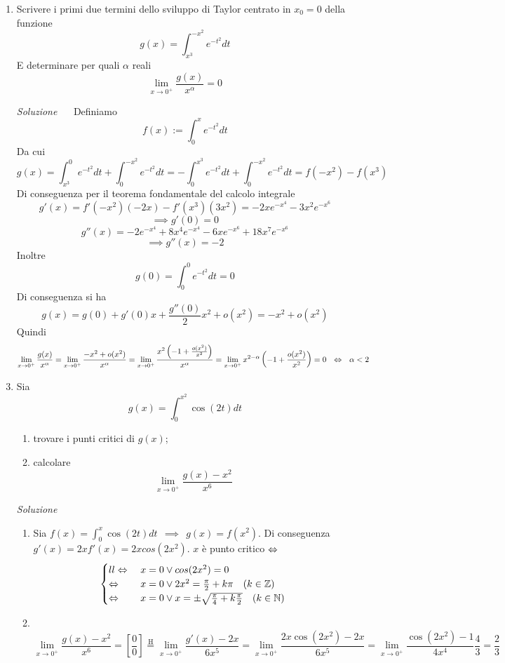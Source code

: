 \documentclass{article}
\begin{document}
\begin{enumerate}[label=\textbf{Esercizio 10.\arabic*.},itemindent=*]
\begin{proof}
    Perchè gli altri due integrali sono non negativi per ipotesi.
    \[\int_{x_0-\delta}^{x_0+\delta}f(x)dx=\sup s(\mathcal{D},f)\geq2\delta \inf_{[x_0-\delta, x_0+\delta]}f=2\delta \inf_{[x_0-\delta, x_0+\delta]}f>0\]
    Poiché $\inf_{[x_0-\delta, x_0+\delta]}f=\min_{[x_0-\delta, x_0+\delta]}f>0$, ottengo una contraddizione.
\end{proof}
\item Scrivere i primi due termini dello sviluppo di Taylor centrato in $x_0=0$ della funzione
\[g(x)=\int_{x^3}^{-x^2}e^{-t^2}dt\]
E determinare per quali $\alpha$ reali 
\[\lim_{x\to0^+}\frac{g(x)}{x^\alpha}=0\]
\item[\textit{\large Soluzione~}]~
Definiamo 
\[f(x):=\int_0^xe^{-t^2}dt\]
Da cui
\[g(x)=\int_{x^3}^0e^{-t^2}dt+\int^{-x^2}_0e^{-t^2}dt=-\int^{x^3}_0e^{-t^2}dt+\int^{-x^2}_0e^{-t^2}dt=f(-x^2)-f(x^3)\]
Di conseguenza per il teorema fondamentale del calcolo integrale
\[g'(x)=f'(-x^2)(-2x)-f'(x^3)(3x^2)=-2xe^{-x^4}-3x^2e^{-x^6}\]
\[\implies g'(0)=0\]
\[g''(x)=-2e^{-x^4}+8x^4e^{-x^4}-6x{e^{-x^6}}+18x^7e^{-x^6}\]
\[\implies g''(x)=-2\]
Inoltre
\[g(0)=\int_{0}^{0}e^{-t^2}dt=0\]
Di conseguenza si ha \[g(x)=g(0)+g'(0)x+\frac{g''(0)}{2}x^2+o(x^2)=-x^2+o(x^2)\tag{$x\to0$}\]
Quindi
\[\lim_{x\to0^+}\frac{g(x)}{x^\alpha}=\lim_{x\to 0^+}\frac{-x^2+o(x^2)}{x^\alpha}=\lim_{x\to 0^+}\frac{x^2\left(-1+\frac{o(x^2)}{x^2}\right)}{x^\alpha}=\lim_{x\to 0^+}x^{2-\alpha}\left(-1+\frac{o(x^2)}{x^2}\right)=0~~\Leftrightarrow~~\alpha<2\]
\item Sia 
\[g(x)=\int_0^{x^2}\cos(2t)dt\]
\begin{enumerate}
    \item trovare i punti critici di $g(x)$;
    \item calcolare 
    \[\lim_{x\to0^+}\frac{g(x)-x^2}{x^6}\]
\end{enumerate}
\item[\textit{\large Soluzione~}]~
\begin{enumerate}
    \item Sia $f(x)=\int_0^{x}\cos(2t)dt~~\implies~~g(x)=f(x^2)$. Di conseguenza $g'(x)=2xf'(x)=2xcos(2x^2)$. $x$ è punto critico $\Leftrightarrow$
    \[\begin{cases}{ll}
        \Leftrightarrow~& x=0\lor cos(2x^2)=0\\
        \Leftrightarrow~& x=0\lor 2x^2=\frac{\pi}{2}+k\pi ~~~(k\in \mathbb{Z})\\
        \Leftrightarrow~& x=0\lor x=\pm\sqrt{\frac{\pi}{4}+k\frac{\pi}{2}} ~~~(k\in \mathbb{N})
    \end{cases}\]
    \item ~\[\lim_{x\to0^+}\frac{g(x)-x^2}{x^6}=\left[\frac{0}{0}\right]\overset{\text{H}}{=}\lim_{x\to0^+}\frac{g'(x)-2x}{6x^5}=\lim_{x\to0^+}\frac{2x\cos (2x^2)-2x}{6x^5}=\lim_{x\to0^+}\frac{\cos(2x^2)-1}{4x^4}\frac{4}{3}=\frac{2}{3}\]
\end{enumerate}


\end{enumerate}
\end{document}
